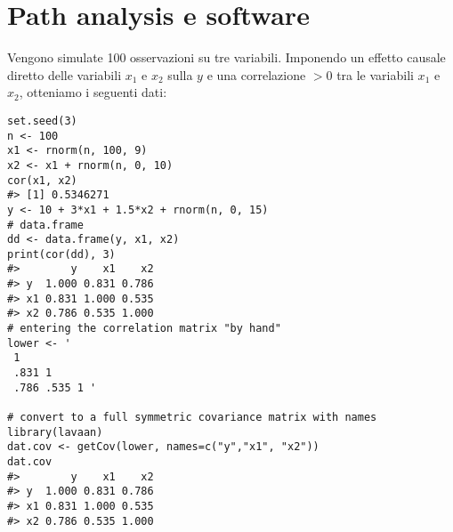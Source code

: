 




%
\section{Path analysis e software \R}


Vengono simulate 100 osservazioni su tre variabili. Imponendo un effetto causale diretto
  delle variabili $x_1$ e $x_2$ sulla $y$ e una correlazione $> 0$ tra le
  variabili $x_1$ e $x_2$, otteniamo i seguenti dati: 

\begin{lstlisting}
set.seed(3)
n <- 100
x1 <- rnorm(n, 100, 9)
x2 <- x1 + rnorm(n, 0, 10)
cor(x1, x2)
#> [1] 0.5346271
y <- 10 + 3*x1 + 1.5*x2 + rnorm(n, 0, 15)
# data.frame
dd <- data.frame(y, x1, x2)
print(cor(dd), 3)
#>        y    x1    x2
#> y  1.000 0.831 0.786
#> x1 0.831 1.000 0.535
#> x2 0.786 0.535 1.000
# entering the correlation matrix "by hand"
lower <- '
 1
 .831 1
 .786 .535 1 '

# convert to a full symmetric covariance matrix with names
library(lavaan)
dat.cov <- getCov(lower, names=c("y","x1", "x2"))
dat.cov
#>        y    x1    x2
#> y  1.000 0.831 0.786
#> x1 0.831 1.000 0.535
#> x2 0.786 0.535 1.000
\end{lstlisting}

